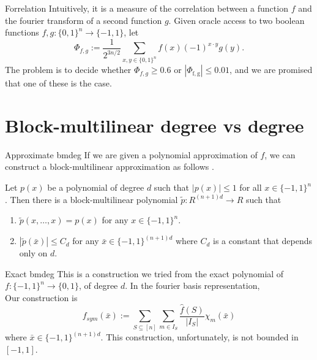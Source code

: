 \documentclass[10pt]{beamer}
\begin{document}
\begin{frame}{Forrelation}
Intuitively, it is a measure of the correlation between a function $f$ and the fourier transform of a second function $g$. Given oracle access to two boolean functions $f,g\colon \{0,1\}^{n} \rightarrow  \{-1,1\}$, let
\begin{equation}
\Phi_{f, g} := \frac{1}{2^{3n/2}} \sum_{x, y \in \{0,1\}^{n}} f(x)(-1)^{x \cdot y} g(y).
\end{equation}
The problem is to decide whether $\Phi_{f,g} \geq 0.6$ or $\left|\Phi_{\mathrm{f}, \mathrm{g}}\right| \leq 0.01$, and we are promised that one of these is the case.
\end{frame}

\section{Block-multilinear degree vs degree}

\begin{frame}{Approximate bmdeg}
If we are given a polynomial approximation of $f$, we can construct a block-multilinear approximation as follows \cite{paper2}.

\begin{theorem}
Let $p(x)$ be a polynomial of degree $d$ such that $|p(x)| \leq 1$ for all $x \in \{-1,1\}^{n}$. Then there is a block-multilinear polynomial $\tilde{p}\colon R^{(n+1) d} \rightarrow R$ such that
\begin{enumerate}
    \item $\tilde{p}(x, \ldots, x) = p(x)$ for any $x \in\{-1,1\}^{n}$.
    \item $|\tilde{p}(\bar{x})| \leq C_{d}$ for any $\bar{x} \in\{-1,1\}^{(n+1) d}$ where $C_{d}$ is a constant that depends only on $d$.
\end{enumerate}
\end{theorem}
\end{frame}

\begin{frame}{Exact bmdeg}
This is a construction we tried from the exact polynomial of $f\colon \{-1,1\}^n\rightarrow \{0,1\}$, of degree $d$. In the fourier basis representation,\\

 Our construction is
\begin{equation}
f_{sym}(\bar{x}) := \sum_{S\subseteq [n]} \sum_{m\in I_S} \frac{\hat{f}(S)}{|I_S|} \chi_m(\bar{x})
\end{equation}
where $\bar{x}\in \{-1,1\}^{(n+1)d}$. This construction, unfortunately, is not bounded in $[-1,1]$.
\end{frame}
\end{document}
